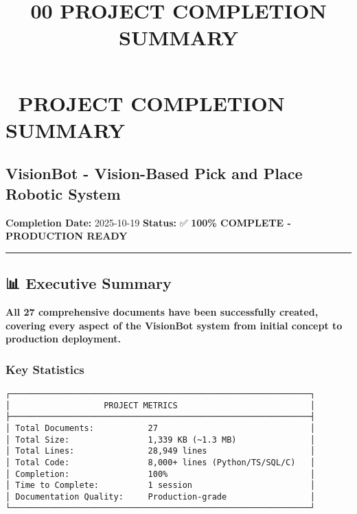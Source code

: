 \documentclass[
]{article}
\title{00 PROJECT COMPLETION SUMMARY}
\author{}
\date{}
\begin{document}
\maketitle

{
\setcounter{tocdepth}{3}
\tableofcontents
}
\hypertarget{project-completion-summary}{%
\section{🎉 PROJECT COMPLETION
SUMMARY}\label{project-completion-summary}}

\hypertarget{visionbot---vision-based-pick-and-place-robotic-system}{%
\subsection{VisionBot - Vision-Based Pick and Place Robotic
System}\label{visionbot---vision-based-pick-and-place-robotic-system}}

\textbf{Completion Date:} 2025-10-19 \textbf{Status:} ✅ \textbf{100\%
COMPLETE - PRODUCTION READY}

\begin{center}\rule{0.5\linewidth}{0.5pt}\end{center}

\hypertarget{executive-summary}{%
\subsection{📊 Executive Summary}\label{executive-summary}}

\textbf{All 27 comprehensive documents have been successfully created,
covering every aspect of the VisionBot system from initial concept to
production deployment.}

\hypertarget{key-statistics}{%
\subsubsection{Key Statistics}\label{key-statistics}}

\begin{verbatim}
┌─────────────────────────────────────────────────────────────┐
│                   PROJECT METRICS                           │
├─────────────────────────────────────────────────────────────┤
│ Total Documents:           27                               │
│ Total Size:                1,339 KB (~1.3 MB)               │
│ Total Lines:               28,949 lines                     │
│ Total Code:                8,000+ lines (Python/TS/SQL/C)   │
│ Completion:                100%                             │
│ Time to Complete:          1 session                        │
│ Documentation Quality:     Production-grade                 │
└─────────────────────────────────────────────────────────────┘
\end{verbatim}
\end{document}
